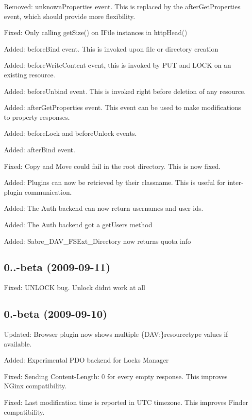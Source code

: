 \begin{DoxyItemize}
\item Removed\+: unknown\+Properties event. This is replaced by the after\+Get\+Properties event, which should provide more flexibility.
\item Fixed\+: Only calling get\+Size() on I\+File instances in http\+Head()
\item Added\+: before\+Bind event. This is invoked upon file or directory creation
\item Added\+: before\+Write\+Content event, this is invoked by P\+UT and L\+O\+CK on an existing resource.
\item Added\+: before\+Unbind event. This is invoked right before deletion of any resource.
\item Added\+: after\+Get\+Properties event. This event can be used to make modifications to property responses.
\item Added\+: before\+Lock and before\+Unlock events.
\item Added\+: after\+Bind event.
\item Fixed\+: Copy and Move could fail in the root directory. This is now fixed.
\item Added\+: Plugins can now be retrieved by their classname. This is useful for inter-\/plugin communication.
\item Added\+: The Auth backend can now return usernames and user-\/id\textquotesingle{}s.
\item Added\+: The Auth backend got a get\+Users method
\item Added\+: Sabre\+\_\+\+D\+A\+V\+\_\+\+F\+S\+Ext\+\_\+\+Directory now returns quota info
\end{DoxyItemize}

\subsection*{0..-\/beta (2009-\/09-\/11) }


\begin{DoxyItemize}
\item Fixed\+: U\+N\+L\+O\+CK bug. Unlock didn\textquotesingle{}t work at all
\end{DoxyItemize}

\subsection*{0.-\/beta (2009-\/09-\/10) }


\begin{DoxyItemize}
\item Updated\+: Browser plugin now shows multiple \{D\+AV\+:\}resourcetype values if available.
\item Added\+: Experimental P\+DO backend for Locks Manager
\item Fixed\+: Sending Content-\/\+Length\+: 0 for every empty response. This improves N\+Ginx compatibility.
\item Fixed\+: Last modification time is reported in U\+TC timezone. This improves Finder compatibility.
\end{DoxyItemize}

